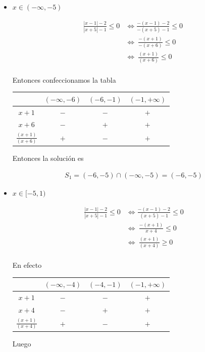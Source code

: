 \documentclass[12pt]{book}
\begin{document}
\begin{itemize}
    \item $x \in (-\infty,-5)$

    \begin{align*}
        \frac{|x-1|-2}{|x+5|-1} \leq 0  &\Longleftrightarrow \frac{-(x-1)-2}{-(x+5)-1} \leq 0 \ \\ &\Longleftrightarrow \ \frac{-(x+1)}{-(x+6)} \leq 0 \\
        &\Longleftrightarrow \ \frac{(x+1)}{(x+6)} \leq 0 \\
    \end{align*}

Entonces confeccionamos la tabla

 \begin{center}
\begin{tabular}{|c|c|c|c|}
\hline
   & $(-\infty,-6) $  & $(-6,-1)$ & $(-1,+\infty)$ \\
   \hline
   $x+1$ & $-$ &$-$ &  $+$ \\ \hline
   $x+6$ & $-$ & $+$ & $+$ \\ \hline \hline
\rule{0pt}{0pt} $\displaystyle \frac{(x+1)}{(x+6)}$ & $+$ & $-$ & $+$ \\
   \hline
\end{tabular}
\end{center}
Entonces la solución es

\begin{align*}
    S_1 = (-6,-5) \cap  (-\infty,-5) =(-6,-5)
\end{align*}
\item $x \in [-5,1)$

\begin{align*}
         \frac{|x-1|-2}{|x+5|-1} \leq 0  &\Longleftrightarrow  \frac{-(x-1)-2}{(x+5)-1} \leq 0 \\ \ &\Longleftrightarrow \ \frac{-(x+1)}{x+4} \leq 0 \\
        &\Longleftrightarrow \ \frac{(x+1)}{(x+4)} \geq 0 \\
\end{align*}

En efecto

\begin{center}
\begin{tabular}{|c|c|c|c|}
\hline
   & $(-\infty,-4) $  & $(-4,-1)$ & $(-1,+\infty)$ \\
   \hline
   $x+1$ & $-$ &$-$ &  $+$ \\ \hline
   $x+4$ & $-$ & $+$ & $+$ \\ \hline \hline
\rule{0pt}{0pt} $\displaystyle \frac{(x+1)}{(x+4)}$ & $+$ & $-$ & $+$ \\
   \hline
\end{tabular}
\end{center}
Luego


\end{itemize}
\end{document}
